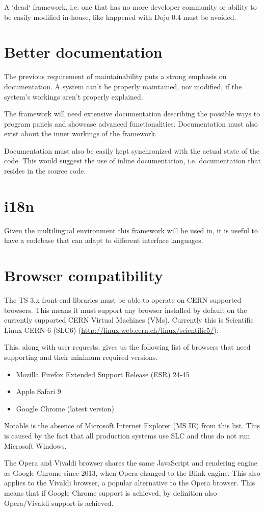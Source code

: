 A `dead` framework, i.e. one that has no more developer community or ability to
be easily modified in-house, like happened with Dojo 0.4 must be avoided.

\section{Better documentation}
The previous requirement of maintainability puts a strong emphasis on documentation.
A system can't be properly maintained, nor modified, if the system's workings
aren't properly explained.

The framework will need extensive documentation describing the possible ways to
program panels and showcase advanced functionalities.
Documentation must also exist about the inner workings of the framework.

Documentation must also be easily kept synchronized with the actual state of the
code. This would suggest the use of inline documentation, i.e. documentation that
resides in the source code.

\section{i18n}
Given the multilingual environment this framework will be used in, it is
useful to have a codebase that can adapt to different interface languages.

\section{Browser compatibility}
The TS 3.x front-end libraries must be able to operate on CERN supported browsers.
This means it must support any browser installed by default on the currently
supported CERN Virtual Machines (VMs). Currently this is Scientific Linux CERN 6
(SLC6) (\url{http://linux.web.cern.ch/linux/scientific5/}).

This, along with user requests, gives us the following list of browsers that
need supporting and their minimum required versions.
\begin{itemize}[noitemsep]
\item Mozilla Firefox Extended Support Release (ESR) 24-45
\item Apple Safari 9
\item Google Chrome (latest version)
\end{itemize}

Notable is the absence of Microsoft Internet Explorer (MS IE) from this list.
This is caused by the fact that all production systems use SLC and thus do not
run Microsoft Windows.

The Opera and Vivaldi browser shares the same JavaScript and rendering engine as Google Chrome
since 2013, when Opera changed to the Blink engine. This also applies to the
Vivaldi browser, a popular alternative to the Opera browser.
This means that if Google Chrome support is achieved, by definition also
Opera/Vivaldi support is achieved.
